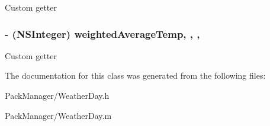 Custom getter \hypertarget{interface_weather_day_a8447b6e2f7cd73dce25e53ae8ac4baaa}{
\subsubsection[{weighted\-Average\-Temp}]{\setlength{\rightskip}{0pt plus 5cm}-\/ (N\-S\-Integer) weighted\-Average\-Temp\hspace{0.3cm}{\ttfamily [read]}, {\ttfamily [write]}, {\ttfamily [nonatomic]}, {\ttfamily [assign]}}}\label{interface_weather_day_a8447b6e2f7cd73dce25e53ae8ac4baaa}
Custom getter 

The documentation for this class was generated from the following files\-:\begin{DoxyCompactItemize}
\item 
Pack\-Manager/Weather\-Day.\-h\item 
Pack\-Manager/Weather\-Day.\-m\end{DoxyCompactItemize}
